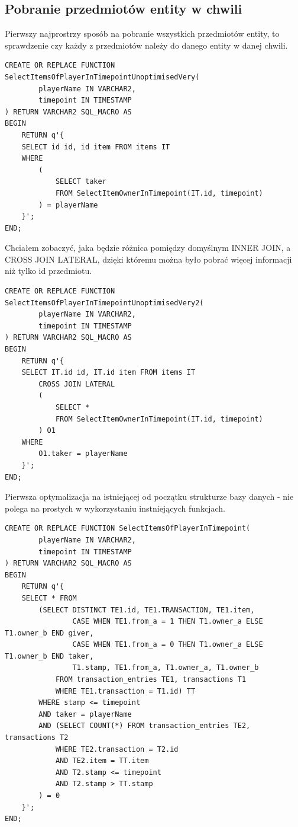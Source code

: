 \documentclass[11pt]{article}
\numberwithin{figure}{subsection}
\begin{document}
		
		
	\subsection{Pobranie przedmiotów entity w chwili}
			
		Pierwszy najprostrzy sposób na pobranie wszystkich przedmiotów entity,
		to sprawdzenie czy każdy z przedmiotów należy do danego entity w danej
		chwili.
		
		\begin{lstlisting}[caption={Pierwsza wersja niezoptymalizowana},captionpos=b]
CREATE OR REPLACE FUNCTION SelectItemsOfPlayerInTimepointUnoptimisedVery(
		playerName IN VARCHAR2,
		timepoint IN TIMESTAMP
) RETURN VARCHAR2 SQL_MACRO AS
BEGIN
	RETURN q'{
	SELECT id id, id item FROM items IT
	WHERE
		(
			SELECT taker
			FROM SelectItemOwnerInTimepoint(IT.id, timepoint) 
		) = playerName
	}';
END;
		\end{lstlisting}
			
		Chciałem zobaczyć, jaka będzie różnica pomiędzy domyślnym INNER JOIN, a
		CROSS JOIN LATERAL, dzięki któremu można było pobrać więcej informacji
		niż tylko id przedmiotu.
		
		\begin{lstlisting}[caption={Druga wesja niezoptymalizowana},captionpos=b]
CREATE OR REPLACE FUNCTION SelectItemsOfPlayerInTimepointUnoptimisedVery2(
		playerName IN VARCHAR2,
		timepoint IN TIMESTAMP
) RETURN VARCHAR2 SQL_MACRO AS
BEGIN
	RETURN q'{
	SELECT IT.id id, IT.id item FROM items IT
		CROSS JOIN LATERAL
		(
			SELECT *
			FROM SelectItemOwnerInTimepoint(IT.id, timepoint) 
		) O1
	WHERE
		O1.taker = playerName
	}';
END;
		\end{lstlisting}
		
		Pierwsza optymalizacja na istniejącej od początku strukturze bazy
		danych - nie polega na prostych w wykorzystaniu instniejących funkcjach.
			
		\begin{lstlisting}[caption={Wersja trochę zoptymalizowana},captionpos=b]
CREATE OR REPLACE FUNCTION SelectItemsOfPlayerInTimepoint(
		playerName IN VARCHAR2,
		timepoint IN TIMESTAMP
) RETURN VARCHAR2 SQL_MACRO AS
BEGIN
	RETURN q'{
	SELECT * FROM
		(SELECT DISTINCT TE1.id, TE1.TRANSACTION, TE1.item,
				CASE WHEN TE1.from_a = 1 THEN T1.owner_a ELSE T1.owner_b END giver,
				CASE WHEN TE1.from_a = 0 THEN T1.owner_a ELSE T1.owner_b END taker,
				T1.stamp, TE1.from_a, T1.owner_a, T1.owner_b
			FROM transaction_entries TE1, transactions T1
			WHERE TE1.transaction = T1.id) TT
		WHERE stamp <= timepoint
		AND taker = playerName
		AND (SELECT COUNT(*) FROM transaction_entries TE2, transactions T2
			WHERE TE2.transaction = T2.id
			AND TE2.item = TT.item
			AND T2.stamp <= timepoint
			AND T2.stamp > TT.stamp
		) = 0
	}';
END;
		\end{lstlisting}
		
\end{document}
